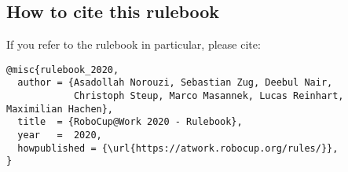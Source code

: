 \begin{titlepage}
\section*{How to cite this rulebook}

If you refer to the rulebook in particular, please cite:

\begin{verbatim}
@misc{rulebook_2020,
  author = {Asadollah Norouzi, Sebastian Zug, Deebul Nair,
            Christoph Steup, Marco Masannek, Lucas Reinhart, Maximilian Hachen},
  title  = {RoboCup@Work 2020 - Rulebook},
  year   =  2020,
  howpublished = {\url{https://atwork.robocup.org/rules/}},
}
\end{verbatim}

\end{titlepage}
